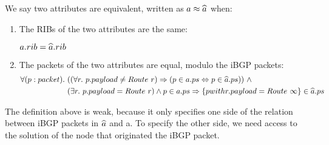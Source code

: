 \documentclass[sigconf,10pt]{acmart}
\begin{document}
\begin{defn}
  We say two attributes are equivalent, written as $a \approx \widehat{a}$ when:
  \begin{enumerate}
  \item The RIBs of the two attributes are the same:
    
    \vspace{0.1cm}
    \begin{adjustbox}{center}
      $a.rib = \widehat{a}.rib$
    \end{adjustbox}
  \item The packets of the two attributes are equal, modulo the iBGP packets:
    \begin{align*}
      \forall (p : packet).~ & ((\forall r.~p.payload \neq Route~r) \Rightarrow (p \in a.ps \Leftrightarrow p \in \widehat{a}.ps))~\wedge \\
                             & (\exists r.~ p.payload = Route~r) \wedge p \in a.ps \Rightarrow \{p with r.payload = Route~\infty\} \in \widehat{a}.ps
    \end{align*}
  \end{enumerate}
\end{defn}

The definition above is weak, because it only specifies one side of
the relation between iBGP packets in $\widehat{a}$ and a. To specify the
other side, we need access to the solution of the node that originated
the iBGP packet.

  
\end{document}
